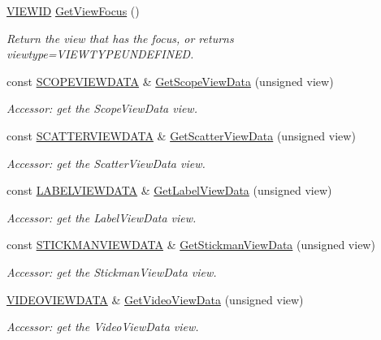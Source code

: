 \begin{CompactItemize}
\hyperlink{class_v_i_e_w_i_d}{VIEWID} \hyperlink{class_main_window_8624537f532fe6c0fe360557e5235774}{GetViewFocus} ()
\begin{CompactList}\small\item\em Return the view that has the focus, or returns viewtype=VIEWTYPEUNDEFINED. \item\end{CompactList}\item 
const \hyperlink{class_s_c_o_p_e_v_i_e_w_d_a_t_a}{SCOPEVIEWDATA} \& \hyperlink{class_main_window_ba1d41fb8d4e492dfef340f6c9275fae}{GetScopeViewData} (unsigned view)
\begin{CompactList}\small\item\em Accessor: get the ScopeViewData view. \item\end{CompactList}\item 
const \hyperlink{class_s_c_a_t_t_e_r_v_i_e_w_d_a_t_a}{SCATTERVIEWDATA} \& \hyperlink{class_main_window_56b41f77501d283ad234b327dacf1602}{GetScatterViewData} (unsigned view)
\begin{CompactList}\small\item\em Accessor: get the ScatterViewData view. \item\end{CompactList}\item 
const \hyperlink{class_l_a_b_e_l_v_i_e_w_d_a_t_a}{LABELVIEWDATA} \& \hyperlink{class_main_window_d1d9f5043255b1d288b6296ce2ff478f}{GetLabelViewData} (unsigned view)
\begin{CompactList}\small\item\em Accessor: get the LabelViewData view. \item\end{CompactList}\item 
const \hyperlink{class_s_t_i_c_k_m_a_n_v_i_e_w_d_a_t_a}{STICKMANVIEWDATA} \& \hyperlink{class_main_window_2472ff83907f8a1508ae7c0c53d9fcf8}{GetStickmanViewData} (unsigned view)
\begin{CompactList}\small\item\em Accessor: get the StickmanViewData view. \item\end{CompactList}\item 
\hyperlink{class_v_i_d_e_o_v_i_e_w_d_a_t_a}{VIDEOVIEWDATA} \& \hyperlink{class_main_window_a41e010b74d2dc3f9fa1ccb9a90837be}{GetVideoViewData} (unsigned view)
\begin{CompactList}\small\item\em Accessor: get the VideoViewData view. \item\end{CompactList}\item 

\end{CompactItemize}

